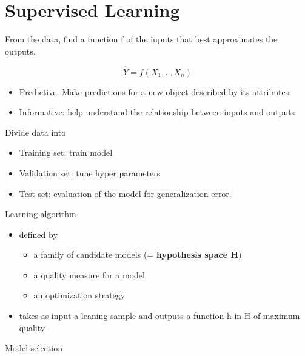\documentclass[
]{book}
\providecommand{\tightlist}{%
  \setlength{\itemsep}{0pt}\setlength{\parskip}{0pt}}
\begin{document}
\hypertarget{supervised-learning}{%
\chapter{Supervised Learning}\label{supervised-learning}}

From the data, find a function f of the inputs that best approximates the outputs.

\[
\hat{Y} = f(X_1,..,X_n)
\]

\begin{itemize}
\tightlist
\item
  Predictive: Make predictions for a new object described by its attributes
\item
  Informative: help understand the relationship between inputs and outputs
\end{itemize}

Divide data into

\begin{itemize}
\tightlist
\item
  Training set: train model
\item
  Validation set: tune hyper parameters
\item
  Test set: evaluation of the model for generalization error.
\end{itemize}

Learning algorithm

\begin{itemize}
\item
  defined by

  \begin{itemize}
  \tightlist
  \item
    a family of candidate models (= \textbf{hypothesis space H})
  \item
    a quality measure for a model
  \item
    an optimization strategy
  \end{itemize}
\item
  takes as input a leaning sample and outputs a function h in H of maximum quality
\end{itemize}

Model selection
\end{document}
